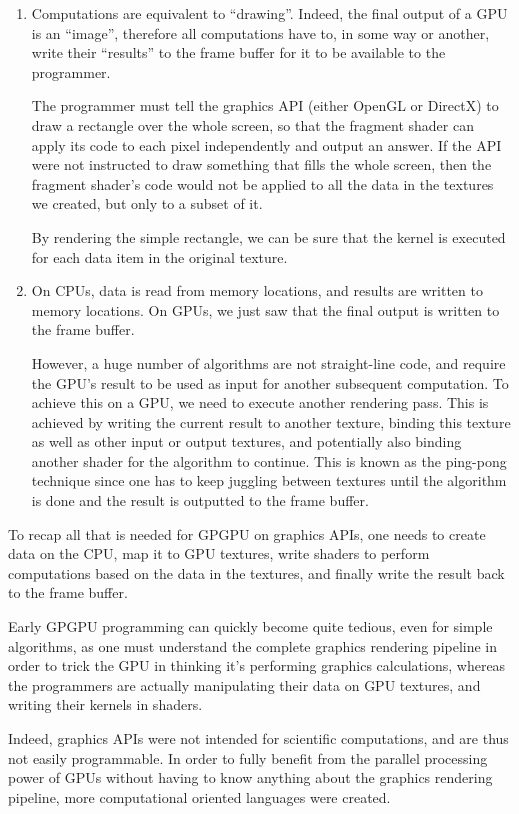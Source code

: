 \documentclass[12pt, a4paper]{report}
\begin{document}
\begin{sloppypar}
\begin{enumerate}
\item Computations are equivalent to ``drawing''.
Indeed, the final output of a GPU is an ``image'', therefore all computations
have to, in some way or another, write their ``results'' to the frame buffer for
it to be available to the programmer.

The programmer must tell the graphics API (either OpenGL or DirectX) to draw a
rectangle over the whole screen, so that the fragment shader can apply its code
to each pixel independently and output an answer.
If the API were not instructed to draw something that fills the whole screen,
then the fragment shader's code would not be applied to all the data in the
textures we created, but only to a subset of it.

By rendering the simple rectangle, we can be sure that the kernel is executed
for each data item in the original texture.

\item On CPUs, data is read from memory locations, and results are written to
memory locations.
On GPUs, we just saw that the final output is written to the frame buffer.

However, a huge number of algorithms are not straight-line code, and require the
GPU's result to be used as input for another subsequent computation.
To achieve this on a GPU, we need to execute another rendering pass.
This is achieved by writing the current result to another texture, binding this
texture as well as other input or output textures, and potentially also binding
another shader for the algorithm to continue.
This is known as the ping-pong technique since one has to keep juggling between
textures until the algorithm is done and the result is outputted to the frame
buffer.

\end{enumerate}

To recap all that is needed for GPGPU on graphics APIs, one needs to create data
on the CPU, map it to GPU textures, write shaders to perform computations based
on the data in the textures, and finally write the result back to the frame
buffer.

Early GPGPU programming can quickly become quite tedious, even for simple
algorithms, as one must understand the complete graphics rendering pipeline in
order to trick the GPU in thinking it's performing graphics calculations,
whereas the programmers are actually manipulating their data on GPU textures,
and writing their kernels in shaders.

Indeed, graphics APIs were not intended for scientific computations, and are
thus not easily programmable.
In order to fully benefit from the parallel processing power of GPUs without
having to know anything about the graphics rendering pipeline, more
computational oriented languages were created.


\end{sloppypar}
\end{document}
